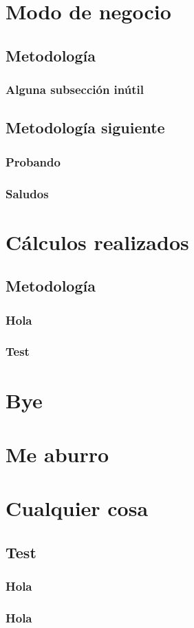 \begin{appendixd}
	\section{Modo de negocio}
		\subsection{Metodología}
			\subsubsection{Alguna subsección inútil}
		\subsection{Metodología siguiente}
			\subsubsection{Probando}
			\subsubsection{Saludos}
	\section{Cálculos realizados}
		\subsection{Metodología}
			\lipsum[1]
			\subsubsection{Hola}
			\subsubsection{Test}
	\section{Bye}
	\section{Me aburro}
\end{appendixd}

\section{Cualquier cosa}
	\subsection{Test}
		\subsubsection{Hola}
		\subsubsection{Hola}